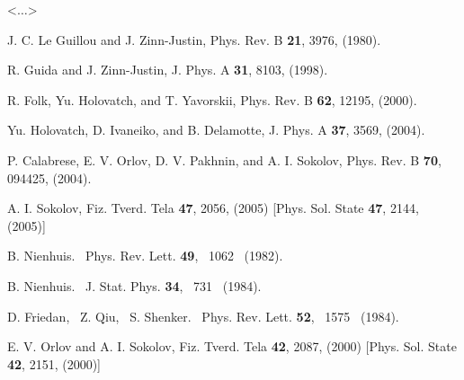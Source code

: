 \documentclass[preprint,preprintnumbers,amsmath,amssymb]{revtex4}
\newcommand{\comment}[1]{} %
\begin{document}
<$\dots$>
\comment{
\section{Conclusion}

To summarize, we have calculated pseudo-$\epsilon$ expansions for dimensionless
effective coupling constant $g^*$ and critical exponents of 2D Euclidean $n$-vector
field theory up to $\tau^5$ order. Numerical estimates of critical exponents for
models with $n = 1, 0, -1$ exactly solvable at criticality have been found using
Pad\'e and Pad\'e-Borel resummation techniques as well as by direct summation with
optimal cut off. Comparison of the results obtained with each others and with their
exact counterparts has shown that direct summation of pseudo-$\epsilon$ expansions
provides, in general, numerical estimates that are no worse than those given by
resummation approaches mentioned. This implies that the pseudo-$\epsilon$ expansion
approach may be thought of as some specific resummation technique.
}

\begin{thebibliography}{999}

 J. C. Le Guillou and J. Zinn-Justin, Phys. Rev. B \textbf{21}, 3976, (1980).

 R. Guida and J. Zinn-Justin, J. Phys. A \textbf{31}, 8103, (1998).

 R. Folk, Yu. Holovatch, and T. Yavorskii, Phys. Rev. B \textbf{62}, 12195, (2000).

 Yu. Holovatch, D. Ivaneiko, and B. Delamotte, J. Phys. A \textbf{37}, 3569, (2004).

 P. Calabrese, E. V. Orlov, D. V. Pakhnin, and A. I. Sokolov, Phys. Rev. B
\textbf{70}, 094425, (2004).

 A. I. Sokolov, Fiz. Tverd. Tela \textbf{47}, 2056, (2005) [Phys. Sol. State
\textbf{47}, 2144, (2005)]

 B. Nienhuis. ~Phys. Rev. Lett. \textbf{49}, ~1062 ~(1982).

 B. Nienhuis. ~J. Stat. Phys. \textbf{34}, ~731 ~(1984).

 D. Friedan, ~Z. Qiu, ~S. Shenker. ~Phys. Rev. Lett. \textbf{52}, ~1575 ~(1984).

 E. V. Orlov and A. I. Sokolov, Fiz. Tverd. Tela \textbf{42}, 2087, (2000)
[Phys. Sol. State \textbf{42}, 2151, (2000)]

\end{thebibliography}
\end{document}
